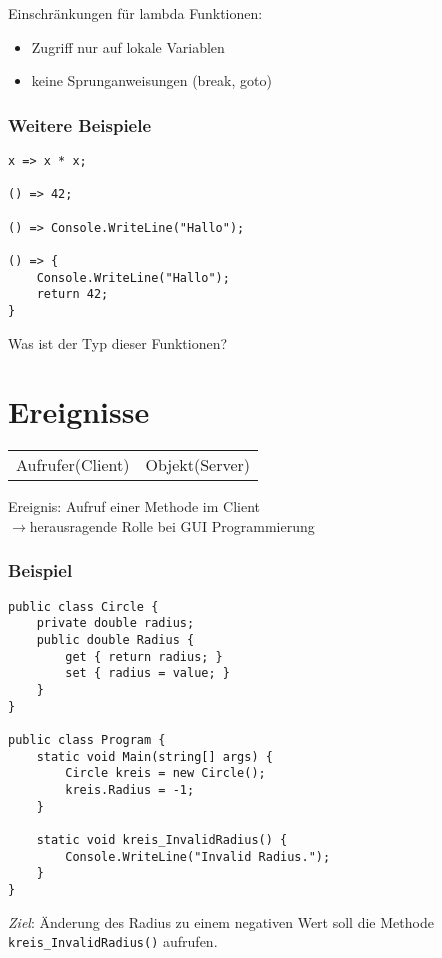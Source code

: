 Einschränkungen für lambda Funktionen:
\begin{itemize}
\item Zugriff nur auf lokale Variablen
\item keine Sprunganweisungen (break, goto)
\end{itemize}

\subsubsection*{Weitere Beispiele}
\begin{lstlisting}[language={[Sharp]C}]
x => x * x;

() => 42;

() => Console.WriteLine("Hallo");

() => { 
	Console.WriteLine("Hallo");
	return 42;
}
\end{lstlisting}

Was ist der Typ dieser Funktionen? 

\section{Ereignisse}

\begin{center}
\begin{tabular}{L{.3}L{.3}}
Aufrufer\newline (Client) &  Objekt\newline (Server)
\end{tabular}
\end{center}
Ereignis: Aufruf einer Methode im Client\\
$\to$herausragende Rolle bei GUI Programmierung

\subsubsection*{Beispiel}
\begin{lstlisting}[language={[Sharp]C}]
public class Circle {
	private double radius;
	public double Radius {
		get { return radius; }
		set { radius = value; }
	}
}

public class Program {  
	static void Main(string[] args) {
		Circle kreis = new Circle();
		kreis.Radius = -1;
	}
	
	static void kreis_InvalidRadius() {
		Console.WriteLine("Invalid Radius.");  
	}
}
\end{lstlisting}

\emph{Ziel}: Änderung des Radius zu einem negativen Wert soll die Methode \lstinline$kreis_InvalidRadius()$ aufrufen.

